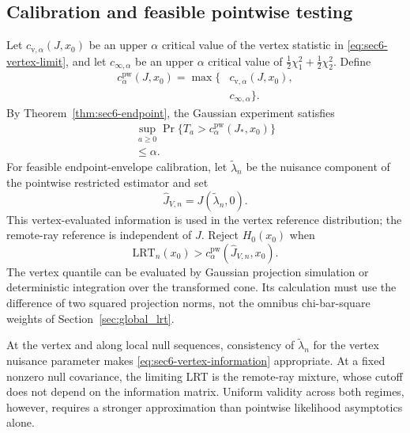 \subsection{Calibration and feasible pointwise testing}
\label{subsec:pointwise_calibration}

Let $c_{\mathrm v,\alpha}(J,x_0)$ be an upper $\alpha$
critical value of the vertex statistic in
\eqref{eq:sec6-vertex-limit}, and let
$c_{\infty,\alpha}$ be an upper $\alpha$ critical value
of $\tfrac12\chi_1^2+\tfrac12\chi_2^2$. Define
\begin{equation}\label{eq:sec6-critical-value}
\begin{aligned}
c_{\alpha}^{\mathrm{pw}}(J,x_0)
=\max\bigl\{
&c_{\mathrm v,\alpha}(J,x_0),\\
&c_{\infty,\alpha}
\bigr\}.
\end{aligned}
\end{equation}
By Theorem~\ref{thm:sec6-endpoint}, the Gaussian experiment
satisfies
\begin{equation}\label{eq:sec6-gaussian-size}
\begin{gathered}
\sup_{a\geq0}
\Pr\bigl\{T_a>
c_{\alpha}^{\mathrm{pw}}(J_*,x_0)\bigr\}\\
\leq\alpha.
\end{gathered}
\end{equation}
For feasible endpoint-envelope calibration, let
$\widetilde\lambda_n$ be the nuisance component of the
pointwise restricted estimator and set
\begin{equation}\label{eq:sec6-vertex-information}
\widehat J_{V,n}=J(\widetilde\lambda_n,0).
\end{equation}
This vertex-evaluated information is used in the vertex
reference distribution; the remote-ray reference is
independent of $J$. Reject $H_0(x_0)$ when
\begin{equation}\label{eq:sec6-feasible-test}
\mathrm{LRT}_n(x_0)>
c_{\alpha}^{\mathrm{pw}}(\widehat J_{V,n},x_0).
\end{equation}
The vertex quantile can be evaluated by Gaussian projection
simulation or deterministic integration over the transformed
cone. Its calculation must use the difference of two squared
projection norms, not the omnibus chi-bar-square weights
of Section~\ref{sec:global_lrt}.

At the vertex and along local null sequences, consistency
of $\widetilde\lambda_n$ for the vertex nuisance parameter
makes \eqref{eq:sec6-vertex-information} appropriate. At a
fixed nonzero null covariance, the limiting LRT is the
remote-ray mixture, whose cutoff does not depend on the
information matrix. Uniform validity across both regimes,
however, requires a stronger approximation than pointwise
likelihood asymptotics alone.

